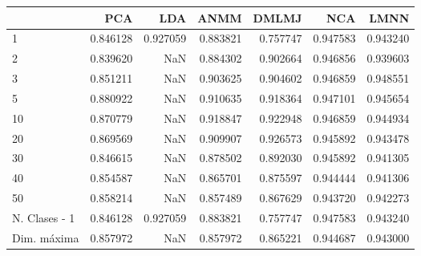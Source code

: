 \begin{tabular}{lrrrrrr}
\toprule
{} &       PCA &       LDA &      ANMM &     DMLMJ &       NCA &      LMNN \\
\midrule
1             &  0.846128 &  0.927059 &  0.883821 &  0.757747 &  0.947583 &  0.943240 \\
2             &  0.839620 &       NaN &  0.884302 &  0.902664 &  0.946856 &  0.939603 \\
3             &  0.851211 &       NaN &  0.903625 &  0.904602 &  0.946859 &  0.948551 \\
5             &  0.880922 &       NaN &  0.910635 &  0.918364 &  0.947101 &  0.945654 \\
10            &  0.870779 &       NaN &  0.918847 &  0.922948 &  0.946859 &  0.944934 \\
20            &  0.869569 &       NaN &  0.909907 &  0.926573 &  0.945892 &  0.943478 \\
30            &  0.846615 &       NaN &  0.878502 &  0.892030 &  0.945892 &  0.941305 \\
40            &  0.854587 &       NaN &  0.865701 &  0.875597 &  0.944444 &  0.941306 \\
50            &  0.858214 &       NaN &  0.857489 &  0.867629 &  0.943720 &  0.942273 \\
N. Clases - 1 &  0.846128 &  0.927059 &  0.883821 &  0.757747 &  0.947583 &  0.943240 \\
Dim. máxima   &  0.857972 &       NaN &  0.857972 &  0.865221 &  0.944687 &  0.943000 \\
\bottomrule
\end{tabular}
